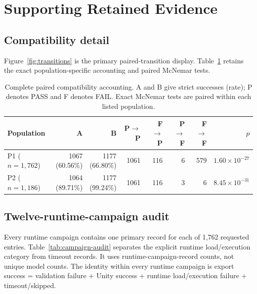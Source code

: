 \section{Supporting Retained Evidence}
\label{app:evidence}

\subsection{Compatibility detail}
Figure~\ref{fig:transitions} is the primary paired-transition display. Table~\ref{tab:compatibility} retains the exact population-specific accounting and paired McNemar tests.

\begin{table}[t]
\centering
\caption{Complete paired compatibility accounting. A and B give strict successes (rate); P denotes PASS and F denotes FAIL. Exact McNemar tests are paired within each listed population.}
\label{tab:compatibility}
\small
\begin{tabular}{@{}lrrrrrrr@{}}
\toprule
Population & A & B & P$\rightarrow$P & F$\rightarrow$P & P$\rightarrow$F & F$\rightarrow$F & $p$ \\
\midrule
P1 ($n=1{,}762$) & \shortstack{1067\\(60.56\%)} & \shortstack{1177\\(66.80\%)} & 1061 & 116 & 6 & 579 & $1.60\times10^{-27}$ \\
P2 ($n=1{,}186$) & \shortstack{1064\\(89.71\%)} & \shortstack{1177\\(99.24\%)} & 1061 & 116 & 3 & 6 & $8.45\times10^{-31}$ \\
\bottomrule
\end{tabular}
\end{table}

\subsection{Twelve-runtime-campaign audit}
Every runtime campaign contains one primary record for each of 1,762 requested entries. Table~\ref{tab:campaign-audit} separates the explicit runtime load/execution category from timeout records. It uses runtime-campaign-record counts, not unique model counts. The identity within every runtime campaign is export success = validation failure + Unity success + runtime load/execution failure + timeout/skipped.

